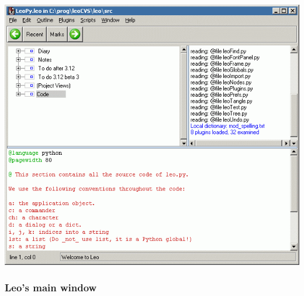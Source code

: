 \documentclass[10pt,a4paper,english]{article}
\begin{document}
\includegraphics{PCWindow.gif}



\hypertarget{leo-s-main-window}{}
\subsubsection*{Leo's main window}
\end{document}
